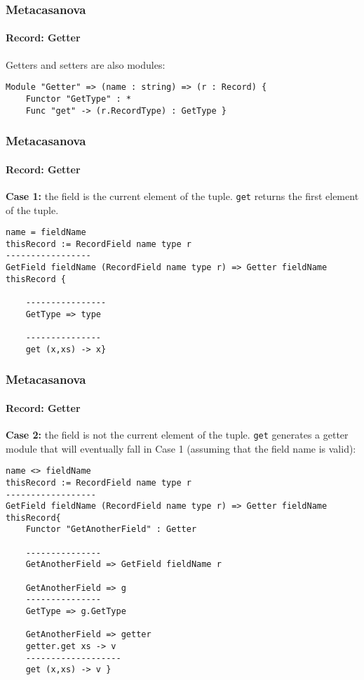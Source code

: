 \documentclass[10pt,a4paper]{beamer}
\begin{document}
\begin{frame}[fragile]
\frametitle{Metacasanova}
\framesubtitle{Record: Getter}

Getters and setters are also modules:
\begin{lstlisting}
Module "Getter" => (name : string) => (r : Record) {
	Functor "GetType" : *
	Func "get" -> (r.RecordType) : GetType }
\end{lstlisting}
\end{frame}

\begin{frame}[fragile]
\frametitle{Metacasanova}
\framesubtitle{Record: Getter}

\textbf{Case 1:} the field is the current element of the tuple. \texttt{get} returns the first element of the tuple.

\begin{lstlisting}
name = fieldName
thisRecord := RecordField name type r
-----------------
GetField fieldName (RecordField name type r) => Getter fieldName thisRecord {

	----------------
	GetType => type
	
	---------------
	get (x,xs) -> x}
\end{lstlisting}
\end{frame}

\begin{frame}[fragile]
\frametitle{Metacasanova}
\framesubtitle{Record: Getter}

\textbf{Case 2:} the field is not the current element of the tuple. \texttt{get} generates a getter module that will eventually fall in Case 1 (assuming that the field name is valid):
\begin{lstlisting}
name <> fieldName
thisRecord := RecordField name type r
------------------
GetField fieldName (RecordField name type r) => Getter fieldName thisRecord{
	Functor "GetAnotherField" : Getter
	
	---------------
	GetAnotherField => GetField fieldName r
	
	GetAnotherField => g
	---------------
	GetType => g.GetType
	
	GetAnotherField => getter
	getter.get xs -> v
	-------------------
	get (x,xs) -> v }
\end{lstlisting}
\end{frame}
\end{document}
